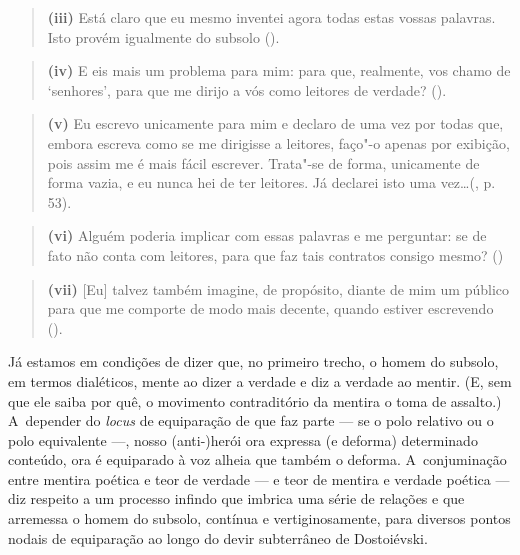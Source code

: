 \begin{quote}
\textbf{(iii)} Está claro que eu mesmo inventei agora todas estas vossas
palavras. Isto provém igualmente do subsolo ().
\end{quote}

\begin{quote}
\textbf{(iv)} E eis mais um problema para mim: para que, realmente, vos
chamo de `senhores', para que me dirijo a vós como leitores de verdade?
().
\end{quote}

\begin{quote}
\textbf{(v)} Eu escrevo unicamente para mim e declaro de uma vez por
todas que, embora escreva como se me dirigisse a leitores, faço"-o apenas
por exibição, pois assim me é mais fácil escrever. Trata"-se de forma,
unicamente de forma vazia, e eu nunca hei de ter leitores. Já declarei
isto uma vez\ldots (, p. 53).
\end{quote}

\begin{quote}
\textbf{(vi)} Alguém poderia implicar com essas palavras e me perguntar:
se de fato não conta com leitores, para que faz tais contratos consigo
mesmo? ()
\end{quote}

\begin{quote}
\textbf{(vii)} {[}Eu{]} talvez também imagine, de propósito, diante de
mim um público para que me comporte de modo mais decente, quando estiver
escrevendo ().
\end{quote}

Já estamos em condições de dizer que, no primeiro trecho, o homem do
subsolo, em termos dialéticos, mente ao dizer a verdade e diz a verdade
ao mentir. (E, sem que ele saiba por quê, o movimento contraditório da
mentira o toma de assalto.) A~depender do \emph{locus} de equiparação de
que faz parte --- se o polo relativo ou o polo equivalente ---, nosso
\mbox{(anti-)herói} ora expressa (e deforma) determinado conteúdo, ora é
equiparado à voz alheia que também o deforma. A~conjuminação entre
mentira poética e teor de verdade --- e teor de mentira e verdade poética
--- diz respeito a um processo infindo que imbrica uma série de relações
e que arremessa o homem do subsolo, contínua e vertiginosamente, para
diversos pontos nodais de equiparação ao longo do devir subterrâneo de
Dostoiévski.

